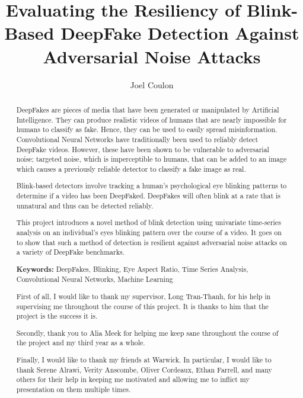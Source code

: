 \documentclass[a4paper]{report}
\author{Joel Coulon}
\title{Evaluating the Resiliency of Blink-Based DeepFake Detection Against Adversarial Noise Attacks}
\begin{document}


\pagestyle{plain}

\begin{abstract}
DeepFakes are pieces of media that have been generated or manipulated by Artificial Intelligence. They can produce realistic videos of humans that are nearly impossible for humans to classify as fake. Hence, they can be used to easily spread misinformation. Convolutional Neural Networks have traditionally been used to reliably detect DeepFake videos. However, these have been shown to be vulnerable to adversarial noise; targeted noise, which is imperceptible to humans, that can be added to an image which causes a previously reliable detector to classify a fake image as real.

Blink-based detectors involve tracking a human's psychological eye blinking patterns to determine if a video has been DeepFaked. DeepFakes will often blink at a rate that is unnatural and thus can be detected reliably.

This project introduces a novel method of blink detection using univariate time-series analysis on an individual's eyes blinking pattern over the course of a video. It goes on to show that such a method of detection is resilient against adversarial noise attacks on a variety of DeepFake benchmarks.

\textbf{Keywords:} DeepFakes, Blinking, Eye Aspect Ratio, Time Series Analysis, Convolutional Neural Networks, Machine Learning
\end{abstract}

\renewcommand{\abstractname}{Acknowledgements}
\begin{abstract}
First of all, I would like to thank my supervisor, Long Tran-Thanh, for his help in supervising me throughout the course of this project. It is thanks to him that the project is the success it is.

Secondly, thank you to Alia Meek for helping me keep sane throughout the course of the project and my third year as a whole.

Finally, I would like to thank my friends at Warwick. In particular, I would like to thank Serene Alrawi, Verity Anscombe, Oliver Cordeaux, Ethan Farrell, and many others for their help in keeping me motivated and allowing me to inflict my presentation on them multiple times.
\end{abstract}

\tableofcontents
\listoffigures
{}
\listofalgorithms
{}
\listoftables
{}
\newpage








\printbibliography

\appendix

\end{document}

